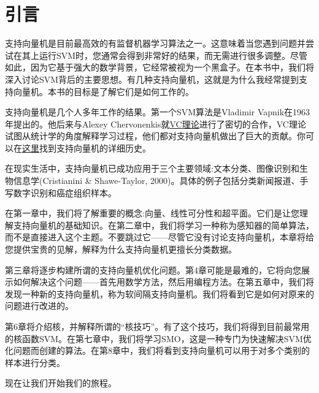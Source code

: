 \chapter*{引言}

支持向量机是目前最高效的有监督机器学习算法之一。这意味着当您遇到问题并尝试在其上运行SVM时，您通常会得到非常好的结果，而无需进行很多调整。尽管如此，因为它基于强大的数学背景，它经常被视为一个黑盒子。在本书中，我们将深入讨论SVM背后的主要思想。有几种支持向量机，这就是为什么我经常提到支持向量机。本书的目标是了解它们是如何工作的。

支持向量机是几个人多年工作的结果。第一个SVM算法是Vladimir Vapnik在1963年提出的。他后来与Alexey Chervonenkis就\href{https://en.wikipedia.org/wiki/Vapnik–Chervonenkis_theory}{VC理论}进行了密切的合作，VC理论试图从统计学的角度解释学习过程，他们都对支持向量机做出了巨大的贡献。你可以在\href{http://www.svms.org/history.html}{这里}找到支持向量机的详细历史。

在现实生活中，支持向量机已成功应用于三个主要领域:文本分类、图像识别和生物信息学(Cristianini \& Shawe-Taylor, 2000)。具体的例子包括分类新闻报道、手写数字识别和癌症组织样本。

在第一章中，我们将了解重要的概念:向量、线性可分性和超平面。它们是让您理解支持向量机的基础知识。在第二章中，我们将学习一种称为感知器的简单算法，而不是直接进入这个主题。不要跳过它——尽管它没有讨论支持向量机，本章将给您提供宝贵的见解，解释为什么支持向量机更擅长分类数据。

第三章将逐步构建所谓的支持向量机优化问题。第4章可能是最难的，它将向您展示如何解决这个问题——首先用数学方法，然后用编程方法。在第五章中，我们将发现一种新的支持向量机，称为软间隔支持向量机。我们将看到它是如何对原来的问题进行改进的。

第6章将介绍核，并解释所谓的“核技巧”。有了这个技巧，我们将得到目前最常用的核函数SVM。在第七章中，我们将学习SMO，这是一种专门为快速解决SVM优化问题而创建的算法。在第8章中，我们将看到支持向量机可以用于对多个类别的样本进行分类。

现在让我们开始我们的旅程。